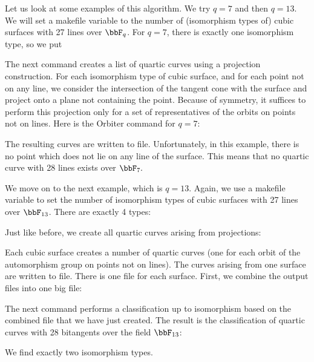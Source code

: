 \bigskip

Let us look at some examples of this algorithm.
We try $q=7$ and then $q=13.$
We will set  a 
makefile variable to the number of (isomorphism types of) cubic surfaces 
with 27 lines over $\bbF_q$. 
For $q=7$, there is exactly one isomorphism type, so we put 
{\tt

}
The next command creates a list of quartic curves using a projection construction. 
For each isomorphism type of cubic surface, 
and for each point not on any line, we 
consider the intersection of the tangent cone 
with the surface and project onto a plane not containing the point. 
Because of symmetry, it suffices to perform this projection 
only for a set of representatives of the orbits 
on points not on lines. 
Here is the Orbiter command for $q=7$:
{\tt

}
The resulting curves are written to file. 
Unfortunately, in this example, 
there is no point which does not lie on any line of the surface.
This means that no quartic curve with 28 lines exists over $\bbF_7.$ 


\bigskip


We move on to the next example, which is $q=13$.
Again, we use a makefile variable to set the number of isomorphism types of 
cubic surfaces with 27 lines over $\bbF_{13}$. 
There are exactly 4 types:
{\tt

}
Just like before, we create all quartic curves arising from projections:
{\tt

}
Each cubic surface creates a number of quartic curves 
(one for each orbit of the automorphism group on points not on lines). 
The curves arising from one surface are written to file. 
There is one file for each surface.
First, we combine the output files into one big file:
{\tt

}
The next command 
performs a classification up to isomorphism based 
on the combined file that we have just created. 
The result is the classification of quartic curves 
with 28 bitangents over the field $\bbF_{13}$:
{\tt

}
We find exactly two isomorphism types. 

\bigskip




